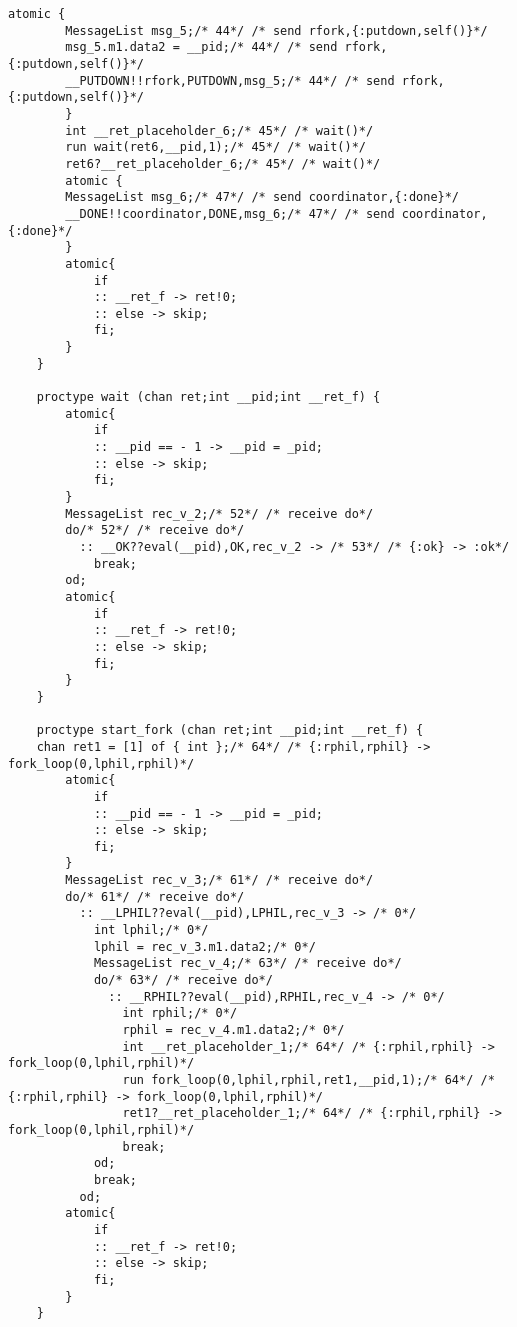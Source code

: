 \begin{lstlisting}[xleftmargin=.001\linewidth, xrightmargin=0.001\linewidth, caption={Dining Philosophers Promela translation.}, label={lst:promela_dp}]
        atomic {
        MessageList msg_5;/* 44*/ /* send rfork,{:putdown,self()}*/ 
        msg_5.m1.data2 = __pid;/* 44*/ /* send rfork,{:putdown,self()}*/ 
        __PUTDOWN!!rfork,PUTDOWN,msg_5;/* 44*/ /* send rfork,{:putdown,self()}*/ 
        }
        int __ret_placeholder_6;/* 45*/ /* wait()*/ 
        run wait(ret6,__pid,1);/* 45*/ /* wait()*/ 
        ret6?__ret_placeholder_6;/* 45*/ /* wait()*/ 
        atomic {
        MessageList msg_6;/* 47*/ /* send coordinator,{:done}*/ 
        __DONE!!coordinator,DONE,msg_6;/* 47*/ /* send coordinator,{:done}*/ 
        }
        atomic{
            if
            :: __ret_f -> ret!0;
            :: else -> skip;
            fi;
        }
    }
    
    proctype wait (chan ret;int __pid;int __ret_f) {
        atomic{
            if
            :: __pid == - 1 -> __pid = _pid;
            :: else -> skip;
            fi;
        }
        MessageList rec_v_2;/* 52*/ /* receive do*/ 
        do/* 52*/ /* receive do*/ 
          :: __OK??eval(__pid),OK,rec_v_2 -> /* 53*/ /* {:ok} -> :ok*/ 
            break;
        od;
        atomic{
            if
            :: __ret_f -> ret!0;
            :: else -> skip;
            fi;
        }
    }
    
    proctype start_fork (chan ret;int __pid;int __ret_f) {
    chan ret1 = [1] of { int };/* 64*/ /* {:rphil,rphil} -> fork_loop(0,lphil,rphil)*/ 
        atomic{
            if
            :: __pid == - 1 -> __pid = _pid;
            :: else -> skip;
            fi;
        }
        MessageList rec_v_3;/* 61*/ /* receive do*/ 
        do/* 61*/ /* receive do*/ 
          :: __LPHIL??eval(__pid),LPHIL,rec_v_3 -> /* 0*/ 
            int lphil;/* 0*/ 
            lphil = rec_v_3.m1.data2;/* 0*/ 
            MessageList rec_v_4;/* 63*/ /* receive do*/ 
            do/* 63*/ /* receive do*/ 
              :: __RPHIL??eval(__pid),RPHIL,rec_v_4 -> /* 0*/ 
                int rphil;/* 0*/ 
                rphil = rec_v_4.m1.data2;/* 0*/ 
                int __ret_placeholder_1;/* 64*/ /* {:rphil,rphil} -> fork_loop(0,lphil,rphil)*/ 
                run fork_loop(0,lphil,rphil,ret1,__pid,1);/* 64*/ /* {:rphil,rphil} -> fork_loop(0,lphil,rphil)*/ 
                ret1?__ret_placeholder_1;/* 64*/ /* {:rphil,rphil} -> fork_loop(0,lphil,rphil)*/ 
                break;
            od;
            break;
          od;
        atomic{
            if
            :: __ret_f -> ret!0;
            :: else -> skip;
            fi;
        }
    }
    

\end{lstlisting}
